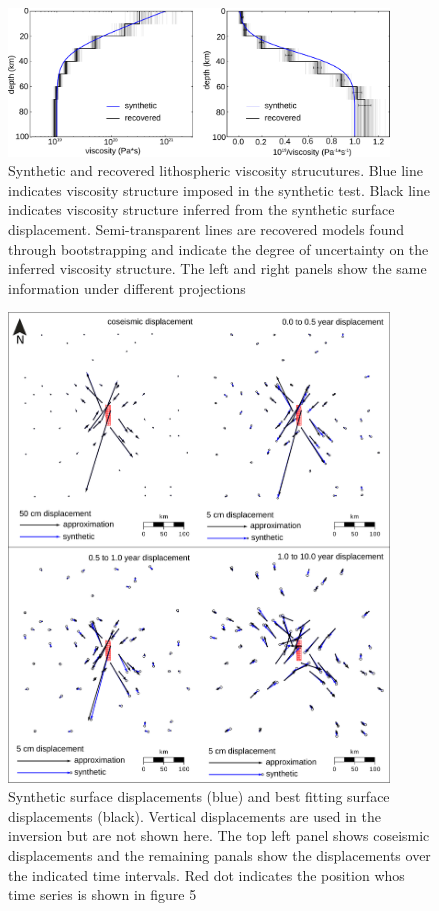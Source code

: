 \documentclass[12pt]{article}
\begin{document}
\begin{figure}[h!]\label{figure3}
  \centering
  \includegraphics[width=0.9\textwidth]{FinalFigures/Figure3.pdf}
  \caption{Synthetic and recovered lithospheric viscosity strucutures.
    Blue line indicates viscosity structure imposed in the synthetic
    test. Black line indicates viscosity structure inferred from the
    synthetic surface displacement.  Semi-transparent lines are
    recovered models found through bootstrapping and indicate the
    degree of uncertainty on the inferred viscosity structure.  The
    left and right panels show the same information under
    different projections}
  \label{figure 3}
\end{figure}

\begin{figure}[h!]\label{figure4}
  \centering
  \includegraphics[width=0.9\textwidth]{FinalFigures/Figure4.pdf}
  \caption{Synthetic surface displacements (blue) and best fitting
    surface displacements (black).  Vertical displacements are used in
    the inversion but are not shown here.  The top left panel shows
    coseismic displacements and the remaining panals show the
    displacements over the indicated time intervals. Red dot indicates
    the position whos time series is shown in figure 5}
  \label{figure 4}
\end{figure}
\end{document}

